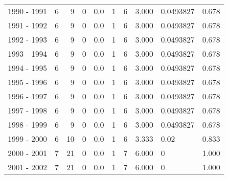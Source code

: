 \begin{tabular}{lrrrrrrrlr}
1990 - 1991 &        6 &        9 &                 0 &               0.0 &                       1 &                          6 &       3.000 &  0.0493827 &             0.678 \\
1991 - 1992 &        6 &        9 &                 0 &               0.0 &                       1 &                          6 &       3.000 &  0.0493827 &             0.678 \\
1992 - 1993 &        6 &        9 &                 0 &               0.0 &                       1 &                          6 &       3.000 &  0.0493827 &             0.678 \\
1993 - 1994 &        6 &        9 &                 0 &               0.0 &                       1 &                          6 &       3.000 &  0.0493827 &             0.678 \\
1994 - 1995 &        6 &        9 &                 0 &               0.0 &                       1 &                          6 &       3.000 &  0.0493827 &             0.678 \\
1995 - 1996 &        6 &        9 &                 0 &               0.0 &                       1 &                          6 &       3.000 &  0.0493827 &             0.678 \\
1996 - 1997 &        6 &        9 &                 0 &               0.0 &                       1 &                          6 &       3.000 &  0.0493827 &             0.678 \\
1997 - 1998 &        6 &        9 &                 0 &               0.0 &                       1 &                          6 &       3.000 &  0.0493827 &             0.678 \\
1998 - 1999 &        6 &        9 &                 0 &               0.0 &                       1 &                          6 &       3.000 &  0.0493827 &             0.678 \\
1999 - 2000 &        6 &       10 &                 0 &               0.0 &                       1 &                          6 &       3.333 &       0.02 &             0.833 \\
2000 - 2001 &        7 &       21 &                 0 &               0.0 &                       1 &                          7 &       6.000 &          0 &             1.000 \\
2001 - 2002 &        7 &       21 &                 0 &               0.0 &                       1 &                          7 &       6.000 &          0 &             1.000 \\

\end{tabular}
